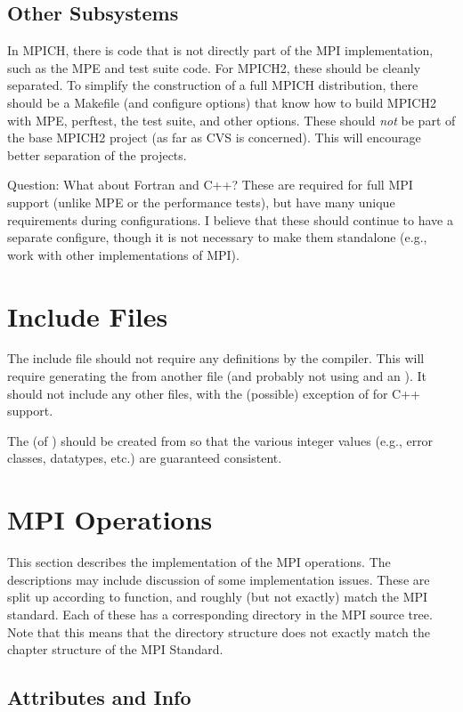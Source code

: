 \documentclass{article}
\begin{document}
\subsection{Other Subsystems}
In MPICH, there is code that is not directly part of the MPI
implementation, such as the MPE and test suite code.  For MPICH2,
these should be cleanly separated.  To simplify the construction of a
full MPICH distribution, there should be a Makefile (and configure
options) that know how to build MPICH2 with MPE, perftest, the test
suite, and other options.  These should \emph{not} be part of the base
MPICH2 project (as far as CVS is concerned).  This will encourage
better separation of the projects.

Question: What about Fortran and C++?  These are required for full MPI support
(unlike MPE or the performance tests), but have many unique requirements
during configurations.  I believe that these should continue to have a
separate configure, though it is not necessary to make them standalone (e.g.,
work with other implementations of MPI).

\section{Include Files}
The include file  should not require any 
definitions by the compiler.  This will require generating the
 from another file (and probably not using  and an
).  It should not include any other
files, with the (possible) exception of  for C++ support.

The  (of ) should be created from
 so that the various integer values (e.g., error classes,
datatypes, etc.) are guaranteed consistent.

\section{MPI Operations}
This section describes the implementation of the MPI operations.  The
descriptions may include discussion of some implementation issues.
These are split up according to function, and roughly (but not
exactly) match the MPI standard.  Each of these has a corresponding
directory in the MPI source tree.  Note that this means that the
directory structure does not exactly match the chapter structure of
the MPI Standard.

\subsection{Attributes and Info}
\end{document}
